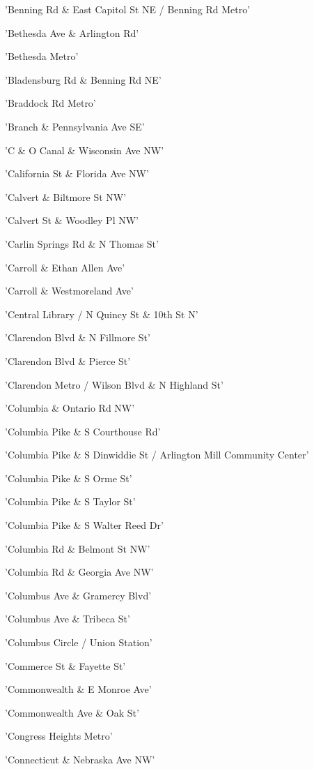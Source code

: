 \documentclass[11pt]{article}
\begin{document}
\begin{enumerate*}
\item 'Benning Rd \& East Capitol St NE / Benning Rd Metro'
\item 'Bethesda Ave \& Arlington Rd'
\item 'Bethesda Metro'
\item 'Bladensburg Rd \& Benning Rd NE'
\item 'Braddock Rd Metro'
\item 'Branch \& Pennsylvania Ave SE'
\item 'C \& O Canal \& Wisconsin Ave NW'
\item 'California St \& Florida Ave NW'
\item 'Calvert \& Biltmore St NW'
\item 'Calvert St \& Woodley Pl NW'
\item 'Carlin Springs Rd \& N Thomas St'
\item 'Carroll \& Ethan Allen Ave'
\item 'Carroll \& Westmoreland Ave'
\item 'Central Library / N Quincy St \& 10th St N'
\item 'Clarendon Blvd \& N Fillmore St'
\item 'Clarendon Blvd \& Pierce St'
\item 'Clarendon Metro / Wilson Blvd \& N Highland St'
\item 'Columbia \& Ontario Rd NW'
\item 'Columbia Pike \& S Courthouse Rd'
\item 'Columbia Pike \& S Dinwiddie St / Arlington Mill Community Center'
\item 'Columbia Pike \& S Orme St'
\item 'Columbia Pike \& S Taylor St'
\item 'Columbia Pike \& S Walter Reed Dr'
\item 'Columbia Rd \& Belmont St NW'
\item 'Columbia Rd \& Georgia Ave NW'
\item 'Columbus Ave \& Gramercy Blvd'
\item 'Columbus Ave \& Tribeca St'
\item 'Columbus Circle / Union Station'
\item 'Commerce St \& Fayette St'
\item 'Commonwealth \& E Monroe Ave'
\item 'Commonwealth Ave \& Oak St'
\item 'Congress Heights Metro'
\item 'Connecticut \& Nebraska Ave NW'

\end{enumerate*}
\end{document}
